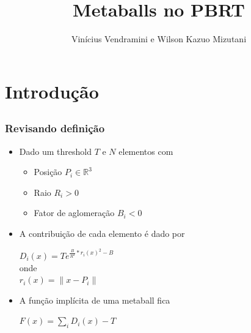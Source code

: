 \documentclass[brazil]{beamer}
\begin{document}
  \title{Metaballs no PBRT}
  \author{Vinícius Vendramini e Wilson Kazuo Mizutani}

  \frame{
    \titlepage
  }
  
  \section{Introdução}
  
    \subsection{}
    
      \begin{frame}
        \frametitle{Revisando definição}
        \begin{itemize}
          \pause
          \item
            Dado um threshold $T$ e $N$ elementos com
            \begin{itemize}
              \item Posição $P_i \in \mathbb{R}^3$
              \item Raio $R_i > 0$
              \item Fator de aglomeração $B_i < 0$
            \end{itemize}
          \pause
          \item A contribuição de cada elemento é dado por
                \vspace{.5em}
                \begin{center}
                  $D_i(x) = Te^{\frac{B}{R^2}*r_i(x)^2 - B}$ \\
                  onde \\
                  $r_i(x) = \| x - P_i \| $
                \end{center}
                \vspace{.5em}
          \pause
          \item A função implícita de uma metaball fica
                \vspace{.5em}
                \begin{center}
                  $F(x) = \sum\limits_{i} D_i(x) - T$
                \end{center}
        \end{itemize}
      \end{frame}
      
      
\end{document}
